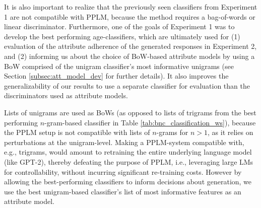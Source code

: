 It is also important to realize that the previously seen classifiers from Experiment 1 are not compatible with PPLM, because the method requires a bag-of-words or linear discriminator. Furthermore, one of the goals of Experiment 1 was to develop the best performing age-classifiers, which are ultimately used for (1) evaluation of the attribute adherence of the generated responses in Experiment 2, and (2) informing us about the choice of BoW-based attribute models by using a BoW comprised of the unigram classifier's most informative unigrams (see Section \ref{subsec:att_model_dev} for further details). It also improves the generalizability of our results to use a separate classifier for evaluation than the discriminators used as attribute models.

Lists of unigrams are used as BoWs (as opposed to lists of trigrams from the best performing $n$-gram-based classifier in Table \ref{tab:bnc_classification_ws}), because the PPLM setup is not compatible with lists of $n$-grams for $n > 1$, as it relies on perturbations at the unigram-level. Making a PPLM-system compatible with, e.g., trigrams, would amount to retraining the entire underlying language model (like GPT-2), thereby defeating the purpose of PPLM, i.e., leveraging large LMs for controllability, without incurring significant re-training costs. However by allowing the best-performing classifiers to inform decisions about generation, we use the best unigram-based classifier's list of most informative features as an attribute model.


